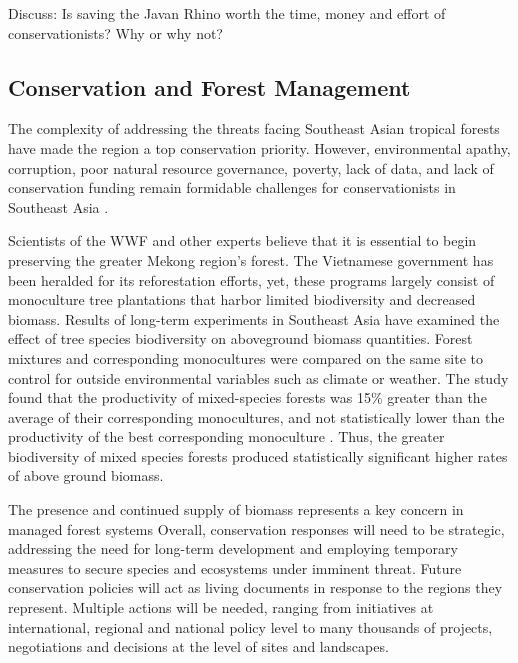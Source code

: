 {\begin{minipage}[c]{.9\textwidth}
\begin{exercise}	
	Discuss:
Is saving the Javan Rhino worth the time, money and effort of conservationists? Why or why not? 
\end{exercise}

\end{minipage}
}

\subsection{Conservation and Forest Management}

The complexity of addressing the threats facing Southeast Asian tropical forests have made the region a top conservation priority. However, environmental apathy, corruption, poor natural resource governance, poverty, lack of data, and lack of conservation funding remain formidable challenges for conservationists in Southeast Asia \citep{sodhi2004southeast}.

Scientists of the WWF and other experts believe that it is essential to begin preserving the greater Mekong region's forest. The Vietnamese government has been heralded for its reforestation efforts, yet, these programs largely consist of monoculture tree plantations that harbor limited biodiversity and decreased biomass. Results of long-term experiments in Southeast Asia have examined the effect of tree species biodiversity on aboveground biomass quantities. Forest mixtures and corresponding monocultures were compared on the same site to control for outside environmental variables such as climate or weather. The study found that the productivity of mixed-species forests was 15\% greater than the average of their corresponding monocultures, and not statistically lower than the productivity of the best corresponding monoculture \citep{sunderland2012evidence}. Thus, the greater biodiversity of mixed species forests produced statistically significant higher rates of above ground biomass.

The presence and continued supply of biomass represents a key concern in managed forest systems  Overall, conservation responses will need to be strategic, addressing the need for long-term development and employing temporary measures to secure species and ecosystems under imminent threat. Future conservation policies will act as living documents in response to the regions they represent. Multiple actions will be needed, ranging from initiatives at international, regional and national policy level to many thousands of projects, negotiations and decisions at the level of sites and landscapes. 

